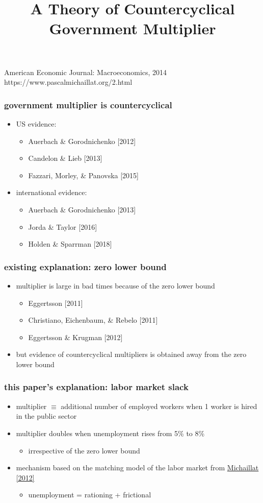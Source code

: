 \documentclass[12pt,xcolor={dvipsnames},hyperref={pdftex,pdfpagemode=UseNone,hidelinks,pdfdisplaydoctitle=true},usepdftitle=false]{beamer}
\begin{document}
\title{A Theory of Countercyclical Government Multiplier}
%
{American Economic Journal: Macroeconomics, 2014}%
{https://www.pascalmichaillat.org/2.html}
\frame[plain]{\titlepage}

\begin{frame}
\frametitle{government multiplier is countercyclical}
\begin{itemize}
\item US evidence:
\begin{itemize}
\item Auerbach \& Gorodnichenko [2012]
\item Candelon \& Lieb [2013]
\item Fazzari, Morley, \& Panovska [2015]
\end{itemize}
\item international evidence:
\begin{itemize}
\item Auerbach \& Gorodnichenko [2013]
\item Jorda \& Taylor [2016]
\item Holden \& Sparrman [2018]
\end{itemize}
\end{itemize}
\end{frame}

\begin{frame}
\frametitle{existing explanation: zero lower bound}
\begin{itemize}
\item multiplier is large in bad times because of the zero lower bound
\begin{itemize}
\item Eggertsson [2011]
\item Christiano, Eichenbaum, \& Rebelo [2011] 
\item Eggertsson \& Krugman [2012]
\end{itemize}
\item but evidence of countercyclical multipliers is obtained away from the zero lower bound
\end{itemize}
\end{frame}

\begin{frame}
\frametitle{this paper's explanation: labor market slack}
\begin{itemize}
\item multiplier $\equiv$ additional number of employed workers when 1 worker is hired in the public sector 
\item multiplier doubles when unemployment rises from 5\% to 8\%
\begin{itemize}
\item irrespective of the zero lower bound
\end{itemize}
\item mechanism based on the matching model of the labor market from \href{https://www.pascalmichaillat.org/1.html}{Michaillat [2012]}
\begin{itemize}
\item unemployment = rationing + frictional
\end{itemize}
\end{itemize}
\end{frame}
\end{document}
